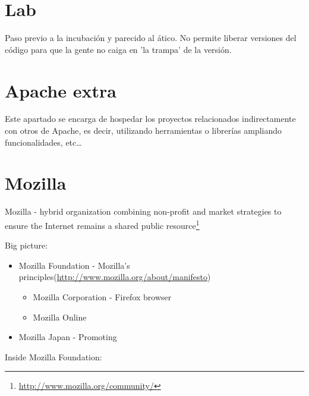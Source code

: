 \documentclass[11pt]{scrartcl}
\begin{document}

\section{Lab}
\label{sec:lab}

\par Paso previo a la incubación y parecido al ático. No permite liberar versiones del código para que la gente no caiga en 'la trampa' de la versión.


\section{Apache extra}
\label{sec:extra}

\par Este apartado se encarga de hospedar los proyectos relacionados indirectamente con otros de Apache, es decir, utilizando herramientas o librerías ampliando funcionalidades, etc\ldots


\section{Mozilla}
\label{sec:mozilla}

\par Mozilla - hybrid organization combining non-profit and market strategies to ensure the Internet remains a shared public resource\footnote{\url{http://www.mozilla.org/community/}}

\par Big picture:

\begin{itemize}
    \item Mozilla Foundation - Mozilla's principles(\url{http://www.mozilla.org/about/manifesto})
    \begin{itemize}
        \item Mozilla Corporation - Firefox browser
        \item Mozilla Online 
    \end{itemize}
    \item Mozilla Japan - Promoting
\end{itemize}

\par Inside Mozilla Foundation:
\end{document}
